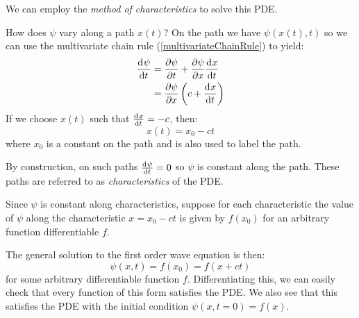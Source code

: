 \documentclass[../main.tex]{subfiles}
\begin{document}
We can employ the \textit{method of characteristics} to solve this PDE.

How does $\psi$ vary along a path $x(t)$?
On the path we have $\psi(x(t), t)$ so we can use the multivariate chain rule (\cref{multivariateChainRule}) to yield:
\begin{align*}
  \deriv{\psi}{t} &= \pderiv{\psi}{t} + \pderiv{\psi}{x} \deriv{x}{t} \\
                   &= \pderiv{\psi}{x}\left(c + \deriv{x}{t}\right)
\end{align*}
If we choose $x(t)$ such that $\deriv{x}{t} = -c$, then:
\[
  x(t)  = x_0 - ct
\]
where $x_0$ is a constant on the path and is also used to label the path.

By construction, on such paths $\deriv{\psi}{t} = 0$ so $\psi$ is constant along the path.
These paths are referred to as \textit{characteristics} of the PDE.
\begin{center}
\end{center}
Since $\psi$ is constant along characteristics, suppose for each characteristic the value of $\psi$ along the characteristic $x = x_0 - ct$ is given by $f(x_0)$ for an arbitrary function differentiable $f$.

The general solution to the first order wave equation is then:
\[
  \psi(x, t) = f(x_0) = f(x + ct)
\]
for some arbitrary differentiable function $f$.
Differentiating this, we can easily check that every function of this form satisfies the PDE.
We also see that this satisfies the PDE with the initial condition $\psi(x, t=0) = f(x)$.
\end{document}

